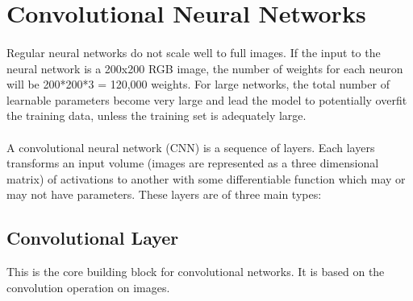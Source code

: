 \documentclass[12pt, a4paper]{report}
\begin{document}
\section{Convolutional Neural Networks}
\paragraph{}
Regular neural networks do not scale well to full images. If the input to the neural network is a 200x200 RGB image, the number of weights for each neuron will be 200*200*3 = 120,000 weights. For large networks, the total number of learnable parameters become very large and lead the model to potentially overfit the training data, unless the training set is adequately large.
\paragraph{}
A convolutional neural network (CNN) is a sequence of layers. Each layers transforms an input volume (images are represented as a three dimensional matrix) of activations to another with some differentiable function which may or may not have parameters.\cite{cs231n, dlai4} These layers are of three main types:
\subsection{Convolutional Layer}
This is the core building block for convolutional networks. It is based on the convolution operation on images.
\end{document}
